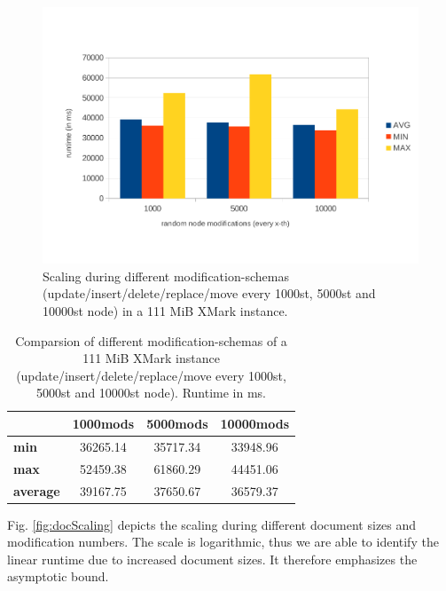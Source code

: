 \begin{figure}[tb]
\centering
\includegraphics[width=\textwidth]{figures/100MB-scaling}
\caption{Scaling during different modification-schemas (update/insert/delete/replace/move every 1000st, 5000st and 10000st node) in a 111 MiB XMark instance.} 
\label{fig:100MBscaling}
\end{figure}

\begin{table}[tb]
\centering 
\begin{tabular}[r]{|l|c|c|c|} 
\hline
& \textbf{1000mods} & \textbf{5000mods} & \textbf{10000mods}\\
\hline
\hline
\textbf{min} & 36265.14 & 35717.34 & 33948.96\\
\hline
\textbf{max} & 52459.38 & 61860.29 & 44451.06\\
\hline
\textbf{average} & 39167.75 & 37650.67 & 36579.37\\
\hline
\end{tabular}
\label{chap3:comparsion}
\vspace{0.5em} 
\caption{Comparsion of different modification-schemas of a 111 MiB XMark instance (update/insert/delete/replace/move every 1000st, 5000st and 10000st node). Runtime in ms.}
\end{table}

Fig. \ref{fig:docScaling} depicts the scaling during different document sizes and modification numbers. The scale is logarithmic, thus we are able to identify the linear runtime due to increased document sizes. It therefore emphasizes the asymptotic bound.

